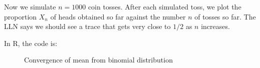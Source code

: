 \begin{example}
Now we simulate $n = 1000$ coin tosses. After each simulated toss, we plot the proportion $X_n$ of heads obtained so far against the number $n$ of tosses so far. The LLN says we should see a trace that gets very close to $1/2$ as $n$ increases.

In R, the code is:

\begin{knitrout}
\color{fgcolor}\begin{kframe}
\begin{alltt}
\hlstd{(}\hlstd{)}                            
 \hlkwb{<-}                                
 \hlkwb{<-} \hlopt{:}                                 

 \hlkwb{<-} \hlstd{(}   \hlstd{=} \hlstd{,}  \hlstd{=} \hlopt{/}\hlstd{)} 
 \hlkwb{<-}  \hlopt{/}                        
  \hlstd{=} \hlstd{,}  \hlstd{=} \hlstd{(}\hlstd{,} \hlstd{),}  \hlstd{=} \hlstd{(}
\hlstd{(} \hlstd{=} \hlstd{,}  \hlstd{=} \hlstd{,}  \hlstd{=} \hlstd{)}
\hlstd{(} \hlstd{=} \hlstd{,}  \hlstd{=} \hlstd{,}  \hlstd{=} \hlstd{)}
\end{alltt}
\end{kframe}
\end{knitrout}

\begin{figure}[H]
  \caption{Convergence of mean from binomial distribution}
    \label{fig:CLTbinomial}
     \centering
    \begin{minipage}{.9\linewidth}
\begin{knitrout}
\color{fgcolor}


\end{knitrout}
\end{minipage}
\end{figure}
\end{example}
